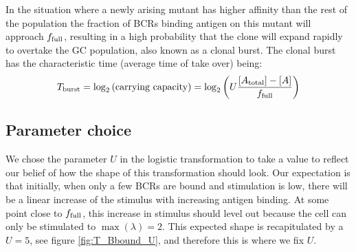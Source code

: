 In the situation where a newly arising mutant has higher affinity than the rest of the population the fraction of BCRs binding antigen on this mutant will approach $f_{\text{full}}$, resulting in a high probability that the clone will expand rapidly to overtake the GC population, also known as a clonal burst.
The clonal burst has the characteristic time (average time of take over) being:
$$
T_{\text{burst}} = \log_2 \left(\text{carrying capacity} \right) = \log_2\left( U \frac{[A_{\text{total}}] - [A]}{f_{\text{full}}} \right)
$$






\subsection{Parameter choice}
We chose the parameter $U$ in the logistic transformation to take a value to reflect our belief of how the shape of this transformation should look.
Our expectation is that initially, when only a few BCRs are bound and stimulation is low, there will be a linear increase of the stimulus with increasing antigen binding.
At some point close to $f_{\text{full}}$, this increase in stimulus should level out because the cell can only be stimulated to $\operatorname{max}(\lambda)=2$.
This expected shape is recapitulated by a $U=5$, see figure \ref{fig:T_Bbound_U}, and therefore this is where we fix $U$.


